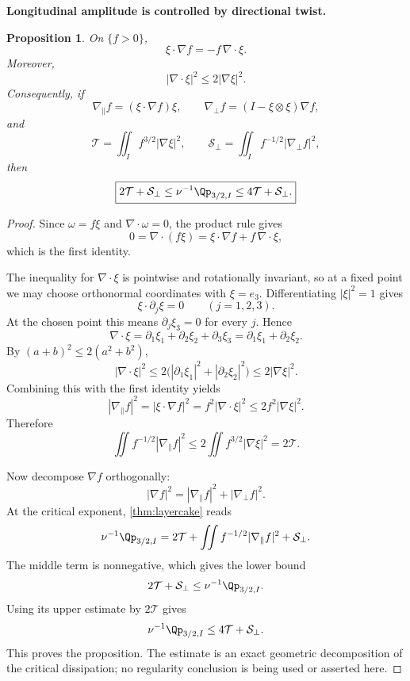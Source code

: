 \documentclass[11pt]{article}
\newtheorem{proposition}[theorem]{Proposition}
\theoremstyle{definition}\newtheorem{definition}[theorem]{Definition}
\theoremstyle{remark}\newtheorem{remark}[theorem]{Remark}
\begin{document}
\medskip
\noindent\textbf{Longitudinal amplitude is controlled by directional twist.}
\begin{proposition}\label{prop:twist-sheath}
On $\{f>0\}$,
\[
\boxed{\xi\cdot\nabla f=-f\,\nabla\cdot\xi.}
\]
Moreover,
\[
|\nabla\cdot\xi|^2\le2|\nabla\xi|^2.
\]
Consequently, if
\[
\nabla_\parallel f=(\xi\cdot\nabla f)\xi,
\qquad
\nabla_\perp f=(I-\xi\otimes\xi)\nabla f,
\]
and
\[
\mathcal T=\iint_I f^{3/2}|\nabla\xi|^2,
\qquad
\mathcal S_\perp=\iint_I f^{-1/2}|\nabla_\perp f|^2,
\]
then
\[
\boxed{
2\mathcal T+\mathcal S_\perp
\le \nu^{-1}\Qp_{3/2,I}
\le4\mathcal T+\mathcal S_\perp.
}
\]
\end{proposition}
\begin{proof}
Since $\omega=f\xi$ and $\nabla\cdot\omega=0$, the product rule gives
\[
0=\nabla\cdot(f\xi)=\xi\cdot\nabla f+f\,\nabla\cdot\xi,
\]
which is the first identity.

The inequality for $\nabla\cdot\xi$ is pointwise and rotationally invariant,
so at a fixed point we may choose orthonormal coordinates with
$\xi=e_3$.  Differentiating $|\xi|^2=1$ gives
\[
\xi\cdot\partial_j\xi=0
\qquad (j=1,2,3).
\]
At the chosen point this means $\partial_j\xi_3=0$ for every $j$.  Hence
\[
\nabla\cdot\xi
=\partial_1\xi_1+\partial_2\xi_2+\partial_3\xi_3
=\partial_1\xi_1+\partial_2\xi_2.
\]
By $(a+b)^2\le2(a^2+b^2)$,
\[
|\nabla\cdot\xi|^2
\le2\bigl(|\partial_1\xi_1|^2+|\partial_2\xi_2|^2\bigr)
\le2|\nabla\xi|^2.
\]
Combining this with the first identity yields
\[
|\nabla_\parallel f|^2
=|\xi\cdot\nabla f|^2
=f^2|\nabla\cdot\xi|^2
\le2f^2|\nabla\xi|^2.
\]
Therefore
\[
\iint f^{-1/2}|\nabla_\parallel f|^2
\le2\iint f^{3/2}|\nabla\xi|^2
=2\mathcal T.
\]

Now decompose $\nabla f$ orthogonally:
\[
|\nabla f|^2
=|\nabla_\parallel f|^2+|\nabla_\perp f|^2.
\]
At the critical exponent, \cref{thm:layercake} reads
\[
\nu^{-1}\Qp_{3/2,I}
=2\mathcal T
+\iint f^{-1/2}|\nabla_\parallel f|^2
+\mathcal S_\perp.
\]
The middle term is nonnegative, which gives the lower bound
\[
2\mathcal T+\mathcal S_\perp
\le\nu^{-1}\Qp_{3/2,I}.
\]
Using its upper estimate by $2\mathcal T$ gives
\[
\nu^{-1}\Qp_{3/2,I}
\le4\mathcal T+\mathcal S_\perp.
\]
This proves the proposition.  The estimate is an exact geometric
decomposition of the critical dissipation; no regularity conclusion is being
used or asserted here.
\end{proof}
\end{document}
